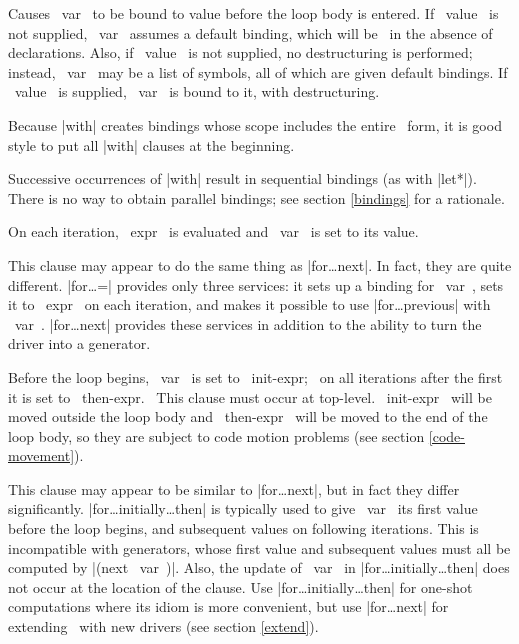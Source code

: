 \begin{clauses}

Causes ~var~ to be bound to value before the loop body is entered.
If ~value~ is not supplied, ~var~ assumes a default
binding, which will be
\nil\ in the absence of declarations.  Also, if ~value~ is not
supplied, no destructuring is performed; instead, ~var~ may be a list of
symbols, all of which are given default
bindings.  If ~value~ is supplied, ~var~ is bound to it, with
destructuring.

\cpar Because |with|
creates bindings whose scope includes the entire \iter\ form, it is
good style to put all |with| clauses at the beginning.

\cpar Successive occurrences of |with| result in sequential
bindings (as with
|let*|).  There is no way to obtain parallel bindings; see
section \ref{bindings} for a rationale.


On each iteration, ~expr~ is evaluated and ~var~ is set
to its value.

\cpar This clause may appear to do the same thing as |for\dots next|.
In fact, they are quite different.  |for\dots =| provides only three
services: it sets up a binding for ~var~, sets it to ~expr~ on each
iteration, and makes it possible to use |for\dots previous| with
~var~.  |for\dots next| provides these services in addition to the
ability to turn the driver into a generator.

Before the loop begins, ~var~ is set to ~init-expr;~ on all
iterations after the first it is set to ~then-expr.~  This clause
must occur at top-level.  ~init-expr~ will be moved outside the loop
body and ~then-expr~ will be moved to the end of the loop body, so
they are subject to code motion problems (see section
\ref{code-movement}).

\cpar This clause may appear to be similar to |for\dots next|, but in
fact they differ significantly.  |for\dots initially\dots then| is
typically used to give ~var~ its first value before the loop begins,
and subsequent values on following iterations.  This is incompatible
with generators, whose first value and subsequent values must all be
computed by |(next ~var~)|.  Also, the update of ~var~ in
|for\dots initially\dots then| does not occur at the location of the
clause.
Use |for\dots initially\dots then| for
one-shot computations where its idiom is more convenient, but use
|for\dots next| for extending \iter\ with new drivers (see section
\ref{extend}).


\end{clauses}
